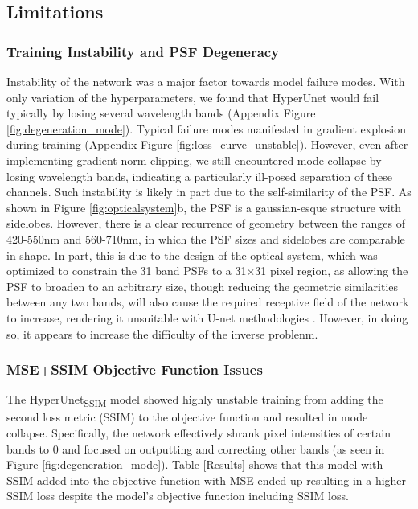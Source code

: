 \documentclass{article}
\begin{document}
\subsection{Limitations}
\subsubsection{Training Instability and PSF Degeneracy}
Instability of the network was a major factor towards model failure modes. With only variation of the hyperparameters, we found that HyperUnet would fail typically by losing several wavelength bands (Appendix Figure \ref{fig:degeneration_mode}). Typical failure modes manifested in gradient explosion during training (Appendix Figure \ref{fig:loss_curve_unstable}). However, even after implementing gradient norm clipping, we still encountered mode collapse by losing wavelength bands, indicating a particularly ill-posed separation of these channels. Such instability is likely in part due to the self-similarity of the PSF. As shown in Figure \ref{fig:opticalsystem}b, the PSF is a gaussian-esque structure with sidelobes. However, there is a clear recurrence of geometry between the ranges of 420-550nm and 560-710nm, in which the PSF sizes and sidelobes are comparable in shape. In part, this is due to the design of the optical system, which was optimized to constrain the 31 band PSFs to a 31×31 pixel region, as allowing the PSF to broaden to an arbitrary size, though reducing the geometric similarities between any two bands, will also cause the required receptive field of the network to increase, rendering it unsuitable with U-net methodologies \cite{deb2022fouriernets}. However, in doing so, it appears to increase the difficulty of the inverse problenm.

\subsubsection{MSE+SSIM Objective Function Issues} 
The HyperUnet\textsubscript{SSIM} model showed highly unstable training from adding the second loss metric (SSIM) to the objective function and resulted in mode collapse. Specifically, the network effectively shrank pixel intensities of certain bands to $0$ and focused on outputting and correcting other bands (as seen in Figure \ref{fig:degeneration_mode}). Table \ref{Results} shows that this model with SSIM added into the objective function with MSE ended up resulting in a higher SSIM loss despite the model's objective function including SSIM loss.
\end{document}
